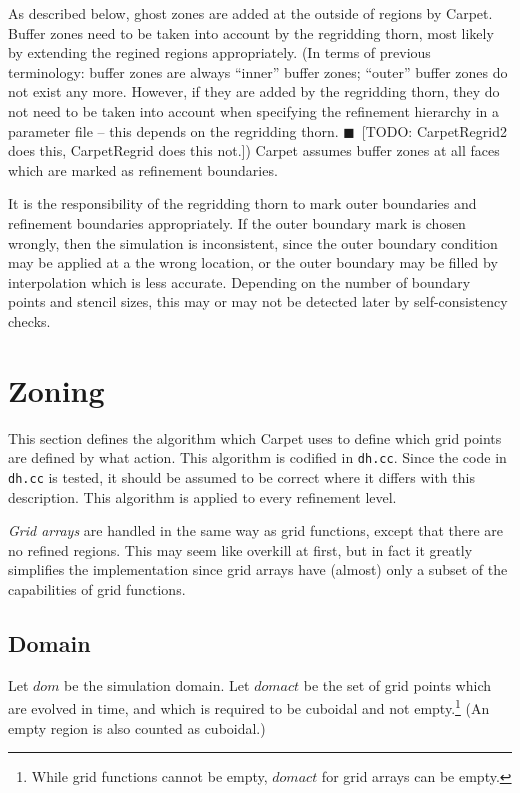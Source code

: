 \documentclass[oneside]{amsart}
\newcommand{\todo}[1]{{\color{blue}$\blacksquare$~\textsf{[TODO: #1]}}}
\newcommand{\code}[1]{\texttt{#1}}
\begin{document}
As described below, ghost zones are added at the outside of regions by
Carpet.  Buffer zones need to be taken into account by the regridding
thorn, most likely by extending the regined regions appropriately.
(In terms of previous terminology: buffer zones are always ``inner''
buffer zones; ``outer'' buffer zones do not exist any more.  However,
if they are added by the regridding thorn, they do not need to be
taken into account when specifying the refinement hierarchy in a
parameter file -- this depends on the regridding thorn.
\todo{CarpetRegrid2 does this, CarpetRegrid does this not.})  Carpet
assumes buffer zones at all faces which are marked as refinement
boundaries.

It is the responsibility of the regridding thorn to mark outer
boundaries and refinement boundaries appropriately.  If the outer
boundary mark is chosen wrongly, then the simulation is inconsistent,
since the outer boundary condition may be applied at a the wrong
location, or the outer boundary may be filled by interpolation which
is less accurate.  Depending on the number of boundary points and
stencil sizes, this may or may not be detected later by
self-consistency checks.



\section{Zoning}

This section defines the algorithm which Carpet uses to define which
grid points are defined by what action.  This algorithm is codified in
\code{dh.cc}.  Since the code in \code{dh.cc} is tested, it should be
assumed to be correct where it differs with this description.  This
algorithm is applied to every refinement level.

\emph{Grid arrays} are handled in the same way as grid functions,
except that there are no refined regions.  This may seem like overkill
at first, but in fact it greatly simplifies the implementation since
grid arrays have (almost) only a subset of the capabilities of grid
functions.

\subsection{Domain}

Let $dom$ be the simulation domain.  Let $domact$ be the set of grid
points which are evolved in time, and which is required to be cuboidal
and not empty.\footnote{While grid functions cannot be empty, $domact$
  for grid arrays can be empty.}  (An empty region is also counted as
cuboidal.)
\end{document}
